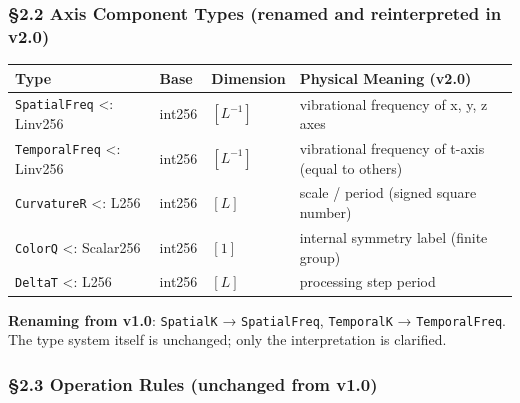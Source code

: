 \documentclass[a4paper,11pt]{article}
\newcounter{none}
\begin{document}
\subsubsection{§2.2 Axis Component Types (renamed and reinterpreted in
v2.0)}\label{axis-component-types-renamed-and-reinterpreted-in-v2.0}

{\def\LTcaptype{none} %
\begin{longtable}[]{@{}
  >{\raggedright\arraybackslash}p{}
  >{\raggedright\arraybackslash}p{}
  >{\raggedright\arraybackslash}p{}
  >{\raggedright\arraybackslash}p{}@{}}
\toprule\noalign{}
\begin{minipage}[b]{\linewidth}\raggedright
Type
\end{minipage} & \begin{minipage}[b]{\linewidth}\raggedright
Base
\end{minipage} & \begin{minipage}[b]{\linewidth}\raggedright
Dimension
\end{minipage} & \begin{minipage}[b]{\linewidth}\raggedright
Physical Meaning (v2.0)
\end{minipage} \\
\midrule\noalign{}
\endhead
\bottomrule\noalign{}
\endlastfoot
\texttt{SpatialFreq} \textless: Linv256 & int256 & \([L^{-1}]\) &
vibrational frequency of x, y, z axes \\
\texttt{TemporalFreq} \textless: Linv256 & int256 & \([L^{-1}]\) &
vibrational frequency of t-axis (equal to others) \\
\texttt{CurvatureR} \textless: L256 & int256 & \([L]\) & scale / period
(signed square number) \\
\texttt{ColorQ} \textless: Scalar256 & int256 & \([1]\) & internal
symmetry label (finite group) \\
\texttt{DeltaT} \textless: L256 & int256 & \([L]\) & processing step
period \\
\end{longtable}
}

\textbf{Renaming from v1.0}: \texttt{SpatialK} → \texttt{SpatialFreq},
\texttt{TemporalK} → \texttt{TemporalFreq}. The type system itself is
unchanged; only the interpretation is clarified.

\subsubsection{§2.3 Operation Rules (unchanged from
v1.0)}\label{operation-rules-unchanged-from-v1.0}
\end{document}
